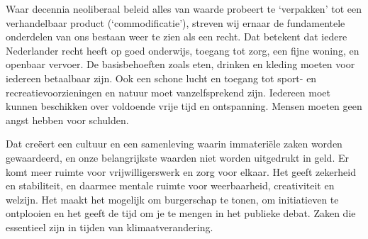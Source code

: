 
Waar decennia neoliberaal beleid alles van waarde probeert te `verpakken' tot een verhandelbaar product (`commodificatie'), streven wij ernaar de fundamentele onderdelen van ons bestaan weer te zien als een recht. Dat betekent dat iedere Nederlander recht heeft op goed onderwijs, toegang tot zorg, een fijne woning, en openbaar vervoer. De basisbehoeften zoals eten, drinken en kleding moeten voor iedereen betaalbaar zijn. Ook een schone lucht en toegang tot sport- en recreatievoorzieningen en natuur moet vanzelfsprekend zijn. Iedereen moet kunnen beschikken over voldoende vrije tijd en ontspanning. Mensen moeten geen angst hebben voor schulden.

Dat creëert een cultuur en een samenleving waarin immateriële zaken worden gewaardeerd, en onze belangrijkste waarden niet worden uitgedrukt in geld. Er komt meer ruimte voor vrijwilligerswerk en zorg voor elkaar. Het geeft zekerheid en stabiliteit, en daarmee mentale ruimte voor weerbaarheid, creativiteit en welzijn. Het maakt het mogelijk om burgerschap te tonen, om initiatieven te ontplooien en het geeft de tijd om je te mengen in het publieke debat. Zaken die essentieel zijn in tijden van klimaatverandering.

